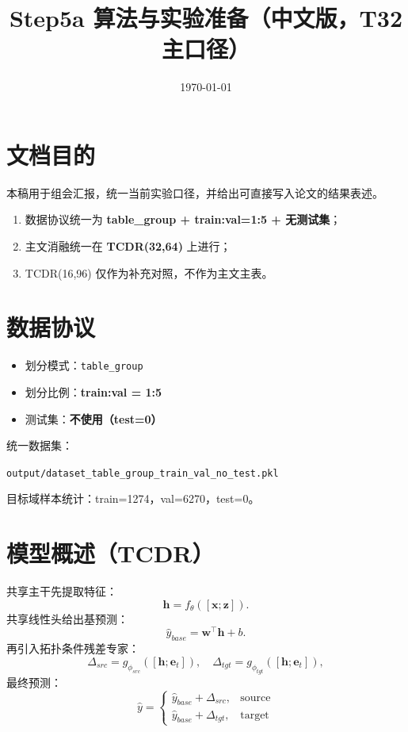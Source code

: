\documentclass[12pt,a4paper]{ctexart}
\title{Step5a 算法与实验准备（中文版，T32 主口径）}
\author{}
\date{\today}
\begin{document}
\maketitle

\section{文档目的}
本稿用于组会汇报，统一当前实验口径，并给出可直接写入论文的结果表述。
\begin{enumerate}
  \item 数据协议统一为 \textbf{table\_group + train:val=1:5 + 无测试集}；
  \item 主文消融统一在 \textbf{TCDR(32,64)} 上进行；
  \item TCDR(16,96) 仅作为补充对照，不作为主文主表。
\end{enumerate}

\section{数据协议}
\begin{itemize}
  \item 划分模式：\texttt{table\_group}
  \item 划分比例：\textbf{train:val = 1:5}
  \item 测试集：\textbf{不使用（test=0）}
\end{itemize}

统一数据集：
\begin{center}
\texttt{output/dataset\_table\_group\_train\_val\_no\_test.pkl}
\end{center}
目标域样本统计：train=1274，val=6270，test=0。

\section{模型概述（TCDR）}
共享主干先提取特征：
\begin{equation}
\mathbf{h}=f_{\theta}([\mathbf{x};\mathbf{z}]).
\end{equation}
共享线性头给出基预测：
\begin{equation}
\hat{y}_{base}=\mathbf{w}^{\top}\mathbf{h}+b.
\end{equation}
再引入拓扑条件残差专家：
\begin{equation}
\Delta_{src}=g_{\phi_{src}}([\mathbf{h};\mathbf{e}_t]),\quad
\Delta_{tgt}=g_{\phi_{tgt}}([\mathbf{h};\mathbf{e}_t]),
\end{equation}
最终预测：
\begin{equation}
\hat{y}=
\begin{cases}
\hat{y}_{base}+\Delta_{src}, & \text{source}\\
\hat{y}_{base}+\Delta_{tgt}, & \text{target}
\end{cases}
\end{equation}
\end{document}
